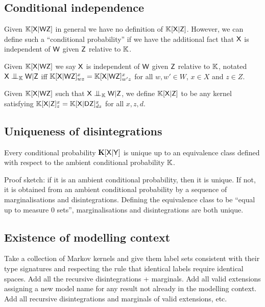 \subsection{Conditional independence}\label{ssec:cond_indep}

Given $\mathbb{K}[\mathsf{X}|\mathsf{W}\mathsf{Z}]$ in general we have no definition of $\mathbb{K}[\mathsf{X}|\mathsf{Z}]$. However, we can define such a ``conditional probability'' if we have the additional fact that $\mathsf{X}$ is independent of $\mathsf{W}$ given $\mathsf{Z}$ relative to $\mathbb{K}$.

Given $\mathbb{K}[\mathsf{X}|\mathsf{W}\mathsf{Z}]$ we say $\mathsf{X}$ is independent of $\mathsf{W}$ given $\mathsf{Z}$ relative to $\mathbb{K}$, notated $\RV{X}\CI_{\model{K}} \RV{W}|\RV{Z}$ iff $\mathbb{K}[\mathsf{X}|\mathsf{WZ}]_{wz}^x = \mathbb{K}[\mathsf{X}|\mathsf{WZ}]_{w'z}^x$ for all $w,w'\in W$, $x\in X$ and $z\in Z$.

Given $\mathbb{K}[\mathsf{X}|\mathsf{W}\mathsf{Z}]$ such that $\RV{X}\CI_{\model{K}} \RV{W}|\RV{Z}$, we define $\mathbb{K}[\mathsf{X}|\mathsf{Z}]$ to be any kernel satisfying $\mathbb{K}[\mathsf{X}|\mathsf{Z}]_z^x = \mathbb{K}[{\mathsf{X}|\mathsf{DZ}}]_{dz}^x$ for all $x,z,d$.

\subsection{Uniqueness of disintegrations}

Every conditional probability $\mathbf{K}[\mathsf{X}|\mathsf{Y}]$ is unique up to an equivalence class defined with respect to the ambient conditional probability $\mathbb{K}$.

Proof sketch: if it is an ambient conditional probability, then it is unique. If not, it is obtained from an ambient conditional probability by a sequence of marginalisations and disintegrations. Defining the equivalence class to be ``equal up to measure 0 sets'', marginalisations and disintegrations are both unique.

\subsection{Existence of modelling context}

Take a collection of Markov kernels and give them label sets consistent with their type signatures and respecting the rule that identical labels require identical spaces. Add all the recursive disintegrations + marginals. Add all valid extensions assigning a new model name for any result not already in the modelling context. Add all recursive disintegrations and marginals of valid extensions, etc.

